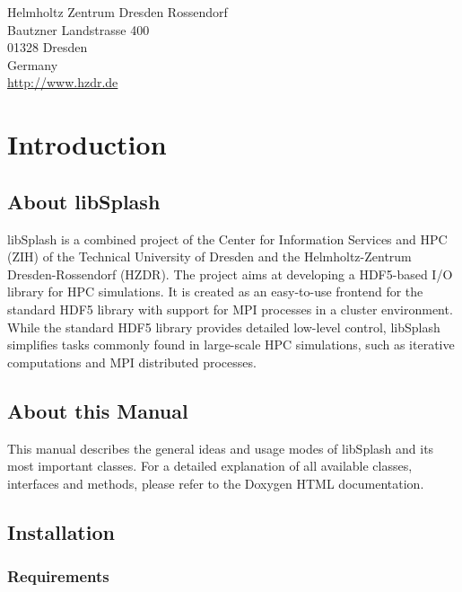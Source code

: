 \documentclass[a4paper,10pt,BCOR12mm]{report}
\begin{document}
\vspace{1cm}

{\noindent}Helmholtz Zentrum Dresden Rossendorf\\
Bautzner Landstrasse 400\\
01328 Dresden\\
Germany\\[1ex]
\url{http://www.hzdr.de}\\

\tableofcontents

\newpage


\chapter{Introduction}

\section{About libSplash}

libSplash is a combined project of the Center for Information Services and HPC (ZIH) of the Technical University of Dresden and the Helmholtz-Zentrum Dresden-Rossendorf (HZDR).
The project aims at developing a HDF5-based I/O library for HPC simulations. It is created as an easy-to-use frontend for the standard HDF5 library with support for MPI processes in a cluster environment.
While the standard HDF5 library provides detailed low-level control, libSplash simplifies tasks commonly found in large-scale HPC simulations, such as iterative computations and MPI distributed processes.

\section{About this Manual}

This manual describes the general ideas and usage modes of libSplash and its most important classes.
For a detailed explanation of all available classes, interfaces and methods, please refer to the
Doxygen HTML documentation.

\newpage

\section{Installation}

\subsection{Requirements}
\end{document}
